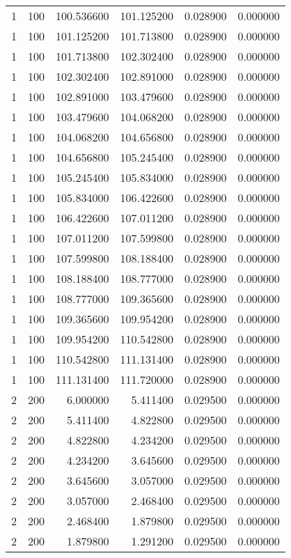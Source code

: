 \begin{longtable}{rrrrrr}
1 & 100 & 100.536600 & 101.125200 & 0.028900 & 0.000000 \\
1 & 100 & 101.125200 & 101.713800 & 0.028900 & 0.000000 \\
1 & 100 & 101.713800 & 102.302400 & 0.028900 & 0.000000 \\
1 & 100 & 102.302400 & 102.891000 & 0.028900 & 0.000000 \\
1 & 100 & 102.891000 & 103.479600 & 0.028900 & 0.000000 \\
1 & 100 & 103.479600 & 104.068200 & 0.028900 & 0.000000 \\
1 & 100 & 104.068200 & 104.656800 & 0.028900 & 0.000000 \\
1 & 100 & 104.656800 & 105.245400 & 0.028900 & 0.000000 \\
1 & 100 & 105.245400 & 105.834000 & 0.028900 & 0.000000 \\
1 & 100 & 105.834000 & 106.422600 & 0.028900 & 0.000000 \\
1 & 100 & 106.422600 & 107.011200 & 0.028900 & 0.000000 \\
1 & 100 & 107.011200 & 107.599800 & 0.028900 & 0.000000 \\
1 & 100 & 107.599800 & 108.188400 & 0.028900 & 0.000000 \\
1 & 100 & 108.188400 & 108.777000 & 0.028900 & 0.000000 \\
1 & 100 & 108.777000 & 109.365600 & 0.028900 & 0.000000 \\
1 & 100 & 109.365600 & 109.954200 & 0.028900 & 0.000000 \\
1 & 100 & 109.954200 & 110.542800 & 0.028900 & 0.000000 \\
1 & 100 & 110.542800 & 111.131400 & 0.028900 & 0.000000 \\
1 & 100 & 111.131400 & 111.720000 & 0.028900 & 0.000000 \\
2 & 200 & 6.000000 & 5.411400 & 0.029500 & 0.000000 \\
2 & 200 & 5.411400 & 4.822800 & 0.029500 & 0.000000 \\
2 & 200 & 4.822800 & 4.234200 & 0.029500 & 0.000000 \\
2 & 200 & 4.234200 & 3.645600 & 0.029500 & 0.000000 \\
2 & 200 & 3.645600 & 3.057000 & 0.029500 & 0.000000 \\
2 & 200 & 3.057000 & 2.468400 & 0.029500 & 0.000000 \\
2 & 200 & 2.468400 & 1.879800 & 0.029500 & 0.000000 \\
2 & 200 & 1.879800 & 1.291200 & 0.029500 & 0.000000 \\

\end{longtable}
